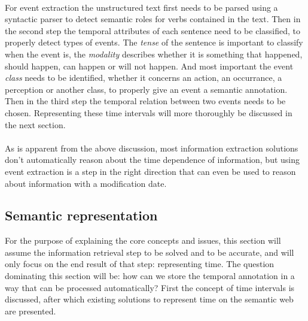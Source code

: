 \documentclass{llncs}
\begin{document}
\\
For event extraction the unstructured text first needs to be parsed using a syntactic parser to detect semantic roles for verbs contained in the text.\cite{Ling2010} Then in the second step the temporal attributes of each sentence need to be classified, to properly detect types of events.\cite{Chambers2007} The \emph{tense} of the sentence is important to classify when the event is, the \emph{modality} describes whether it is something that happened, should happen, can happen or will not happen. And most important the event \emph{class} needs to be identified, whether it concerns an action, an occurrance, a perception or another class, to properly give an event a semantic annotation. Then in the third step the temporal relation between two events needs to be chosen. Representing these time intervals will more thoroughly be discussed in the next section.\\
\\
As is apparent from the above discussion, most information extraction solutions don't automatically reason about the time dependence of information, but using event extraction is a step in the right direction that can even be used to reason about information with a modification date.


\subsection{Semantic representation}
\label{sec:static-representation}

For the purpose of explaining the core concepts and issues, this section will assume the information retrieval step to be solved and to be accurate, and will only focus on the end result of that step: representing time. The question dominating this section will be: how can we store the temporal annotation in a way that can be processed automatically? First the concept of time intervals is discussed, after which existing solutions to represent time on the semantic web are presented.
\end{document}

